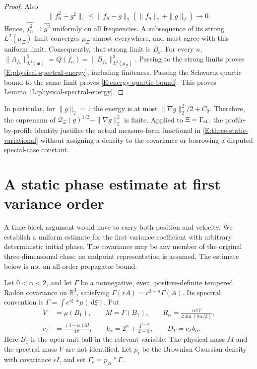 \documentclass[12pt]{article}
\numberwithin{equation}{section}
\theoremstyle{definition}
\newcommand{\R}{\mathbb{R}}
\newcommand{\ud}{\,\mathrm{d}}
\begin{document}
\begin{proof}
  Also
  \[
    \|f_n^2-g^2\|_1
    \le\|f_n-g\|_2(\|f_n\|_2+\|g\|_2)\longrightarrow0.
  \]
  Hence, $\widehat{f_n^2}\to\widehat{g^2}$ uniformly on all
  frequencies. A subsequence of its strong $L^2(\mu_\Xi)$ limit
  converges $\mu_\Xi$-almost everywhere, and must agree with this
  uniform limit. Consequently, that strong limit is $B_g$.
  For every $n$,
  $\|A_{f_n}\|_{L^2(\mathfrak m)}^2
  =Q(f_n)=\|B_{f_n}\|_{L^2(\mu_\Xi)}^2$.
  Passing to the strong limits proves
  \eqref{E:physical-spectral-energy}, including finiteness.
  Passing the Schwartz quartic bound to the same limit proves
  \eqref{E:energy-quartic-bound}.
  This proves Lemma~\ref{L:physical-spectral-energy}.
\end{proof}

In particular, for $\|g\|_2=1$ the energy is at most
$\|\nabla g\|_2^2/2+C_0$. Therefore, the supremum of
$\mathcal Q_\Xi(g)^{1/2}-\|\nabla g\|_2^2$ is finite.
Applied to $\Xi=\Gamma_{\rm st}$, the profile-by-profile identity
justifies the actual measure-form functional in
\eqref{E:three-static-variational} without assigning a density to
the covariance or borrowing a disputed special-case constant.

\section{A static phase estimate at first variance order}
\label{S:static-phase}

A time-block argument would have to carry both position and velocity.
We establish a uniform estimate for the first variance coefficient with
arbitrary deterministic initial phase. The covariance may be any member
of the original three-dimensional class; no endpoint representation is
assumed. The estimate below is not an all-order propagator bound.


Let $0<\alpha<2$, and let $\Gamma$ be a nonnegative, even,
positive-definite tempered Radon covariance on $\R^3$, satisfying
$\Gamma(rA)=r^{3-\alpha}\Gamma(A)$. Its spectral convention is
$\Gamma=\int e^{i\xi\cdot x}\mu(\ud\xi)$. Put
\begin{equation}\label{E:phase-constants}
  \begin{split}
    V&=\mu(B_1),\qquad M=\Gamma(B_1),\qquad
    R_\alpha=\frac{\alpha\pi V}{2\sin(\pi\alpha/2)},\\
    c_\Gamma&=\frac{(3-\alpha)M}{4\pi},\qquad
    b_\alpha=2^\alpha+\frac{3^{2-\alpha}}{2-\alpha},\qquad
    D_\Gamma=c_\Gamma b_\alpha.
  \end{split}
\end{equation}
Here $B_1$ is the open unit ball in the relevant variable.
The physical mass $M$ and the spectral mass $V$ are not identified.
Let $p_\epsilon$ be the Brownian Gaussian density with covariance
$\epsilon I$, and set
$\Gamma_\epsilon=p_{2\epsilon}*\Gamma$.
\end{document}
